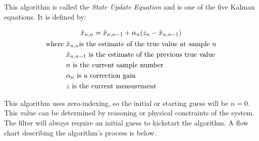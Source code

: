         This algorithm is called the \textit{State Update Equation} and is one of the five Kalman equations. 
        It is defined by:

        \begin{gather} \labeq{state_update_eq}
            \hat{x}_{n,n} = \hat{x}_{n,n-1} + \alpha_n(z_n - \hat{x}_{n,n-1}) \\
            \begin{aligned}
                \text{where } &\hat{x}_{n,n} \text{is the estimate of the true value at sample $n$} \\
                &\hat{x}_{n,n-1} \text{ is the estimate of the previous true value} \\
                &n \text{ is the current sample number} \\
                &\alpha_n \text{ is a correction gain} \\
                &z \text{ is the current measurement} \\
            \end{aligned} \notag
        \end{gather}



        This algorithm uses zero-indexing, so the initial or starting guess will be $n=0$.
        This value can be determined by reasoning or physical constraints of the system.
        The filter will always require an initial guess to kickstart the algorithm.
        A flow chart describing the algorithm's process is below.
        

